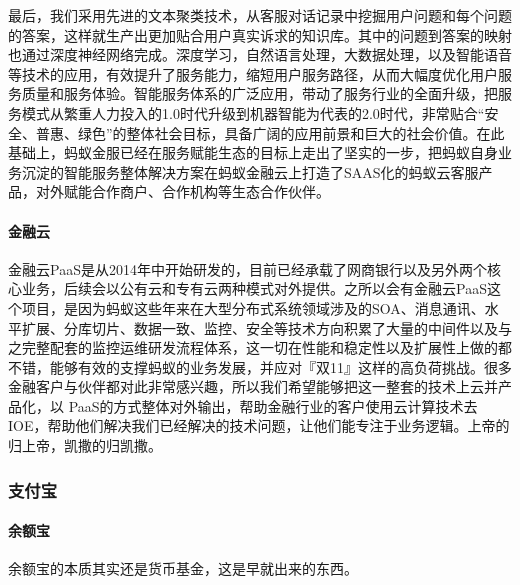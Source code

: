 \documentclass[letterpaper,10pt,english]{sphinxmanual}
\begin{document}
最后，我们采用先进的文本聚类技术，从客服对话记录中挖掘用户问题和每个问题的答案，这样就生产出更加贴合用户真实诉求的知识库。其中的问题到答案的映射也通过深度神经网络完成。深度学习，自然语言处理，大数据处理，以及智能语音等技术的应用，有效提升了服务能力，缩短用户服务路径，从而大幅度优化用户服务质量和服务体验。智能服务体系的广泛应用，带动了服务行业的全面升级，把服务模式从繁重人力投入的1.0时代升级到机器智能为代表的2.0时代，非常贴合“安全、普惠、绿色”的整体社会目标，具备广阔的应用前景和巨大的社会价值。在此基础上，蚂蚁金服已经在服务赋能生态的目标上走出了坚实的一步，把蚂蚁自身业务沉淀的智能服务整体解决方案在蚂蚁金融云上打造了SAAS化的蚂蚁云客服产品，对外赋能合作商户、合作机构等生态合作伙伴。
%
\begin{footnote}[989]\sphinxAtStartFootnote
{}
%
\end{footnote}


\paragraph{金融云}
\label{\detokenize{chapter_AI_company/antgroup:id4}}
金融云PaaS是从2014年中开始研发的，目前已经承载了网商银行以及另外两个核心业务，后续会以公有云和专有云两种模式对外提供。之所以会有金融云PaaS这个项目，是因为蚂蚁这些年来在大型分布式系统领域涉及的SOA、消息通讯、水平扩展、分库切片、数据一致、监控、安全等技术方向积累了大量的中间件以及与之完整配套的监控运维研发流程体系，这一切在性能和稳定性以及扩展性上做的都不错，能够有效的支撑蚂蚁的业务发展，并应对『双11』这样的高负荷挑战。很多金融客户与伙伴都对此非常感兴趣，所以我们希望能够把这一整套的技术上云并产品化，以
PaaS的方式整体对外输出，帮助金融行业的客户使用云计算技术去IOE，帮助他们解决我们已经解决的技术问题，让他们能专注于业务逻辑。上帝的归上帝，凯撒的归凯撒。%
\begin{footnote}[990]\sphinxAtStartFootnote
{}
%
\end{footnote}


\subsubsection{支付宝}
\label{\detokenize{chapter_AI_company/alipay:id1}}\label{\detokenize{chapter_AI_company/alipay::doc}}

\paragraph{余额宝}
\label{\detokenize{chapter_AI_company/alipay:id2}}
余额宝的本质其实还是货币基金，这是早就出来的东西。
\end{document}
